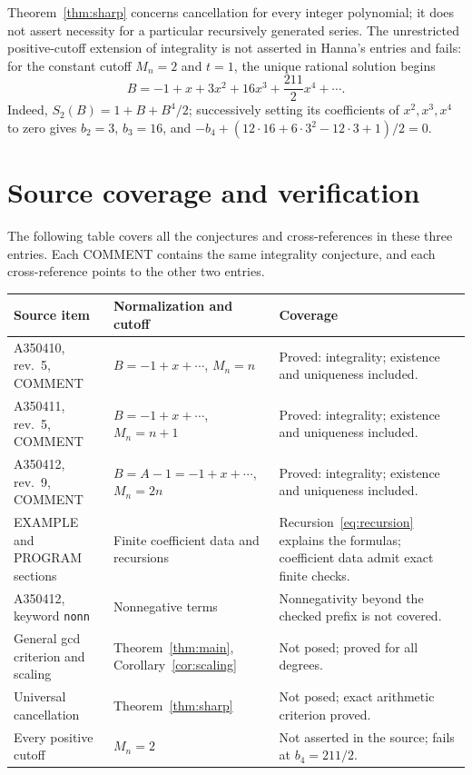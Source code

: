 \documentclass[11pt]{article}
\begin{document}
Theorem~\ref{thm:sharp} concerns cancellation for every integer polynomial;
it does not assert necessity for a particular recursively generated series.
The unrestricted positive-cutoff extension of integrality is not asserted
in Hanna's entries and fails: for the constant cutoff $M_n=2$ and $t=1$,
the unique rational solution begins
\[
 B=-1+x+3x^2+16x^3+\frac{211}{2}x^4+\cdots.
\]
Indeed, $S_2(B)=1+B+B^4/2$; successively setting its coefficients of
$x^2,x^3,x^4$ to zero gives $b_2=3$, $b_3=16$, and
$-b_4+(12\cdot16+6\cdot3^2-12\cdot3+1)/2=0$.

\section{Source coverage and verification}
The following table covers all the conjectures and cross-references in these
three entries. Each COMMENT contains the same integrality conjecture, and each
cross-reference points to the other two entries.
\begin{center}\small
\begin{tabular}{@{}>{\raggedright\arraybackslash}p{.21\linewidth}>{\raggedright\arraybackslash}p{.29\linewidth}>{\raggedright\arraybackslash}p{.41\linewidth}@{}}
\toprule
Source item & Normalization and cutoff & Coverage\\
\midrule
A350410, rev.\ 5, COMMENT & $B=-1+x+\cdots$, $M_n=n$ & Proved: integrality; existence and uniqueness included.\\[3pt]
A350411, rev.\ 5, COMMENT & $B=-1+x+\cdots$, $M_n=n+1$ & Proved: integrality; existence and uniqueness included.\\[3pt]
A350412, rev.\ 9, COMMENT & $B=A-1=-1+x+\cdots$, $M_n=2n$ & Proved: integrality; existence and uniqueness included.\\[3pt]
EXAMPLE and PROGRAM sections & Finite coefficient data and recursions & Recursion~\eqref{eq:recursion} explains the formulas; coefficient data admit exact finite checks.\\[3pt]
A350412, keyword \texttt{nonn} & Nonnegative terms & Nonnegativity beyond the checked prefix is not covered.\\[3pt]
General gcd criterion and scaling & Theorem~\ref{thm:main}, Corollary~\ref{cor:scaling} & Not posed; proved for all degrees.\\[3pt]
Universal cancellation & Theorem~\ref{thm:sharp} & Not posed; exact arithmetic criterion proved.\\[3pt]
Every positive cutoff & $M_n=2$ & Not asserted in the source; fails at $b_4=211/2$.\\
\bottomrule
\end{tabular}
\end{center}
\end{document}
